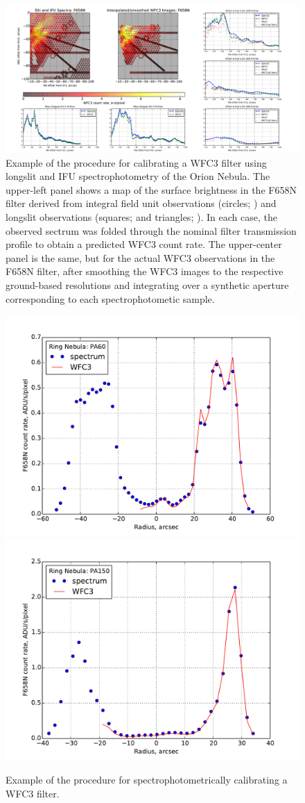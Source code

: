 \documentclass[preprint]{aastex}
\begin{document}
\begin{figure}[t]
  \centering
  \includegraphics[width=\linewidth]{manu-F658N-red-maps}
  \caption{Example of the procedure for calibrating a WFC3 filter
    using longslit and IFU spectrophotometry of the Orion Nebula.  The
    upper-left panel shows a map of the surface brightness in the
    F658N filter derived from integral field unit observations
    (circles; \citealp{Nunez-Diaz:2013a}) and longslit observations
    (squares; \citealp{ODell:2010a} and triangles;
    \citealp{Mesa-Delgado:2008a}).  In each case, the observed sectrum
    was folded through the nominal filter transmission profile to
    obtain a predicted WFC3 count rate.  The upper-center panel is the
    same, but for the actual WFC3 observations in the F658N filter,
    after smoothing the WFC3 images to the respective ground-based
    resolutions and integrating over a synthetic aperture
    corresponding to each spectrophotometic sample.}
  \label{fig:orioncomparison-F658N}
\end{figure}

\begin{figure}[b]
  \includegraphics[width=0.5\linewidth]{ring-profile-pa60-F658N}%
  \includegraphics[width=0.5\linewidth]{ring-profile-pa150-F658N}%
  \caption{Example of the procedure for spectrophotometrically
    calibrating a WFC3 filter.  }
  \label{fig:ringcomparison-F658N}
\end{figure}
\end{document}
